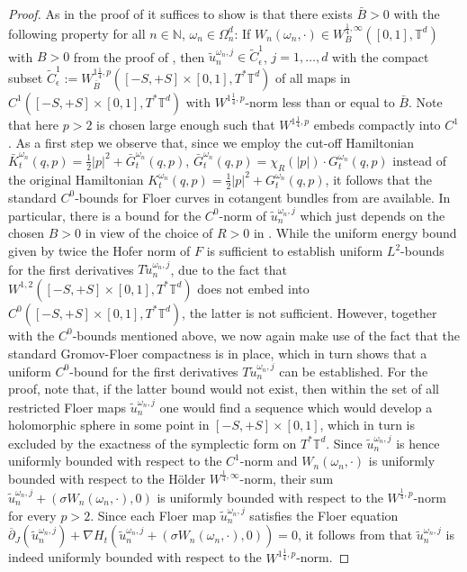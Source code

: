 \documentclass[a4paper,11pt]{amsart}
\newcommand{\NN}{\mathbb{N}}
\newcommand{\TT}{\mathbb{T}}
\begin{document}
\begin{proof}
As in the proof of  it suffices to show is that there exists $\bar{B}>0$ with the following property for all $n\in\NN$, $\omega_n\in\Omega_n^d$: If $W_n(\omega_n,\cdot)\in W^{\frac{1}{4},\infty}_B([0,1],\TT^d)$ with $B>0$ from the proof of , then $\widetilde{u}^{\omega_n,j}_n\in \widetilde{C}^1_{\epsilon}$, $j=1,\ldots,d$ with the compact subset $\widetilde{C}^1_{\epsilon}:=W^{1\frac{1}{4},p}_{\bar{B}}([-S,+S]\times [0,1],T^*\TT^d)$ of all maps in $C^1([-S,+S]\times[0,1],T^*\TT^d)$ with $W^{1\frac{1}{4},p}$-norm less than or equal to $\bar{B}$. Note that here $p>2$ is chosen large enough such that $W^{1\frac{1}{4},p}$ embeds compactly into $C^1$. 
As a first step we observe that, since we employ the cut-off Hamiltonian $\bar{K}_t^{\omega_n}(q,p)=\frac{1}{2}|p|^2+\bar{G}_t^{\omega_n}(q,p)$, $\bar{G}_t^{\omega_n}(q,p)=\chi_R(|p|)\cdot G_t^{\omega_n}(q,p)$ instead of the original Hamiltonian $K_t^{\omega_n}(q,p)=\frac{1}{2}|p|^2+G_t^{\omega_n}(q,p)$, it follows that the standard $C^0$-bounds for Floer curves in cotangent bundles from \cite{C} are available. In particular, there is a bound for the $C^0$-norm of $\widetilde{u}^{\omega_n,j}_n$ which just depends on the chosen $B>0$ in view of the choice of $R>0$ in . While the uniform energy bound given by twice the Hofer norm of $F$ is sufficient to establish uniform $L^2$-bounds for the first derivatives $T\widetilde{u}^{\omega_n,j}_n$, due to the fact that $W^{1,2}([-S,+S]\times [0,1],T^*\TT^d)$ does not embed into $C^0([-S,+S]\times [0,1],T^*\TT^d)$, the latter is not sufficient. However, together with the $C^0$-bounds mentioned above, we now again make use of the fact that the standard Gromov-Floer compactness is in place, which in turn shows that a uniform $C^0$-bound for the first derivatives $T\widetilde{u}^{\omega_n,j}_n$ can be established. For the proof, note that, if the latter bound would not exist, then within the set of all restricted Floer maps $\widetilde{u}^{\omega_n,j}_n$ one would find a sequence which would develop a holomorphic sphere in some point in $[-S,+S]\times [0,1]$, which in turn is excluded by the exactness of the symplectic form on $T^*\TT^d$. Since $\widetilde{u}^{\omega_n,j}_n$ is hence uniformly bounded with respect to the $C^1$-norm and $W_n(\omega_n,\cdot)$ is uniformly bounded with respect to the Hölder $W^{\frac{1}{4},\infty}$-norm, their sum $\widetilde{u}^{\omega_n,j}_n+(\sigma W_n(\omega_n,\cdot),0)$ is uniformly bounded with respect to the $W^{\frac{1}{4},p}$-norm for every $p>2$. 
Since each Floer map $\widetilde{u}^{\omega_n,j}_n$ satisfies the Floer equation $\overline{\partial}_J(\widetilde{u}^{\omega_n,j}_n)+\nabla H_t(\widetilde{u}^{\omega_n,j}_n+(\sigma W_n(\omega_n,\cdot),0))=0$, it follows from  that $\widetilde{u}^{\omega_n,j}_n$ is indeed uniformly bounded with respect to the $W^{1\frac{1}{4},p}$-norm. \end{proof}
\end{document}
